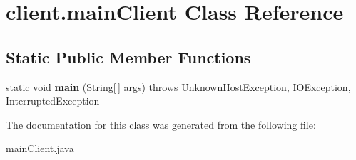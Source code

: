 \hypertarget{classclient_1_1mainClient}{}\section{client.\+main\+Client Class Reference}
\label{classclient_1_1mainClient}
\subsection*{Static Public Member Functions}
\begin{DoxyCompactItemize}
\item 
\mbox{\label{classclient_1_1mainClient_a0b28fb87463204b64524e5261b283d23}} 
static void {\bfseries main} (String\mbox{[}$\,$\mbox{]} args)  throws Unknown\+Host\+Exception, I\+O\+Exception, Interrupted\+Exception 
\end{DoxyCompactItemize}


The documentation for this class was generated from the following file\+:\begin{DoxyCompactItemize}
\item 
main\+Client.\+java\end{DoxyCompactItemize}
